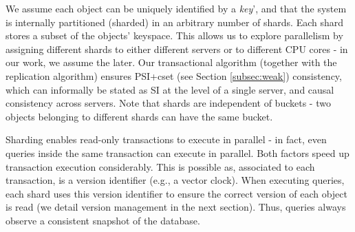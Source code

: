 We assume each object can be uniquely identified by a \emph{key}', and that the system is internally partitioned (sharded) in an arbitrary number of shards. 
Each shard stores a subset of the objects' keyspace.
This allows us to explore parallelism by assigning different shards to either different servers or to different CPU cores - in our work, we assume the later.
Our transactional algorithm (together with the replication algorithm) ensures PSI+cset (see Section \ref{subsec:weak}) consistency, which can informally be stated as SI at the level of a single server, and causal consistency across servers.
Note that shards are independent of buckets - two objects belonging to different shards can have the same bucket. 

Sharding enables read-only transactions to execute in parallel - in fact, even queries inside the same transaction can execute in parallel.
Both factors speed up transaction execution considerably.
This is possible as, associated to each transaction, is a version identifier (e.g., a vector clock).
When executing queries, each shard uses this version identifier to ensure the correct version of each object is read (we detail version management in the next section).
Thus, queries always observe a consistent snapshot of the database.

